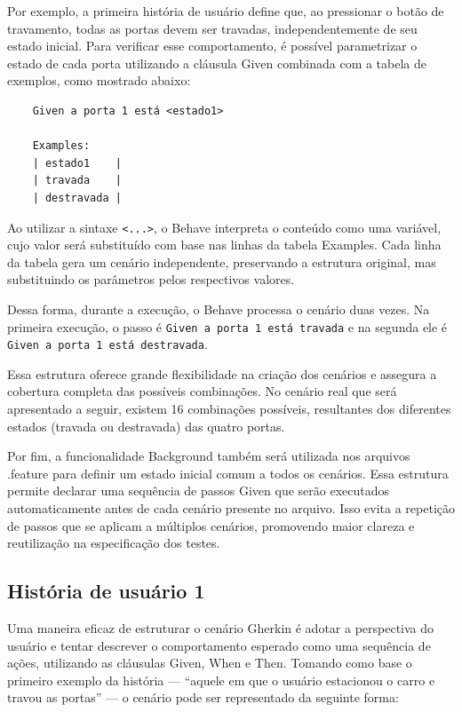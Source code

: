 Por exemplo, a primeira história de usuário define que, ao pressionar o botão de travamento, todas as portas devem ser travadas, independentemente de seu estado 
inicial. Para verificar esse comportamento, é possível parametrizar o estado de cada porta utilizando a cláusula Given combinada com a tabela de exemplos, 
como mostrado abaixo:

\begin{verbatim}
    Given a porta 1 está <estado1>
    
    Examples:
    | estado1    |
    | travada    |
    | destravada |
\end{verbatim}


Ao utilizar a sintaxe \texttt{<...>}, o Behave interpreta o conteúdo como uma variável, cujo valor será substituído com base nas linhas da tabela Examples. Cada 
linha da tabela gera um cenário independente, preservando a estrutura original, mas substituindo os parâmetros pelos respectivos valores.

Dessa forma, durante a execução, o Behave processa o cenário duas vezes. Na primeira execução, o passo é \texttt{Given a porta 1 está travada} e na segunda 
ele é \texttt{Given a porta 1 está destravada}.

Essa estrutura oferece grande flexibilidade na criação dos cenários e assegura a cobertura completa das possíveis combinações. No cenário real que será apresentado 
a seguir, existem 16 combinações possíveis, resultantes dos diferentes estados (travada ou destravada) das quatro portas.

Por fim, a funcionalidade Background também será utilizada nos arquivos .feature para definir um estado inicial comum a todos os cenários. Essa estrutura permite 
declarar uma sequência de passos Given que serão executados automaticamente antes de cada cenário presente no arquivo. Isso evita a repetição de passos que se 
aplicam a múltiplos cenários, promovendo maior clareza e reutilização na especificação dos testes.

\subsection{História de usuário 1}

Uma maneira eficaz de estruturar o cenário Gherkin é adotar a perspectiva do usuário e tentar descrever o comportamento esperado como uma sequência de ações, 
utilizando as cláusulas Given, When e Then. Tomando como base o primeiro exemplo da história — “aquele em que o usuário estacionou o carro e travou as portas” — 
o cenário pode ser representado da seguinte forma:


